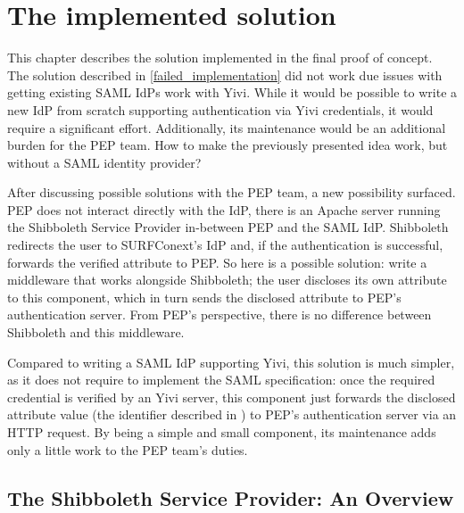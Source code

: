 \documentclass{report}
\begin{document}
\chapter{The implemented solution}
This chapter describes the solution implemented in the final proof of concept. The solution described in \ref{failed_implementation} did not work due issues with getting existing
SAML IdPs work with Yivi. While it would be possible to write a new IdP from scratch supporting authentication via Yivi credentials, it would require a significant effort.
Additionally, its maintenance would be an additional burden for the PEP team. How to make the previously presented idea work, but without a SAML identity provider? \par
After discussing possible solutions with the PEP team, a new possibility surfaced. PEP does not interact directly with the IdP, there is an Apache server running the Shibboleth Service
Provider in-between PEP and the SAML IdP. Shibboleth redirects the user to SURFConext's IdP and, if the authentication is successful, forwards the verified attribute to PEP. So
here is a possible solution: write a middleware that works alongside Shibboleth; the user discloses its own attribute to this component, which in turn sends the disclosed attribute
to PEP's authentication server. From PEP's perspective, there is no difference between Shibboleth and this middleware. \par
Compared to writing a SAML IdP supporting Yivi, this solution is much simpler, as it does not require to implement the SAML specification: once the required credential is verified
by an Yivi server, this component just forwards the disclosed attribute value (the identifier described in ) to PEP's authentication server via an HTTP request. By
being a simple and small component, its maintenance adds only a little work to the PEP team's duties. 

\section{The Shibboleth Service Provider: An Overview}
\end{document}
